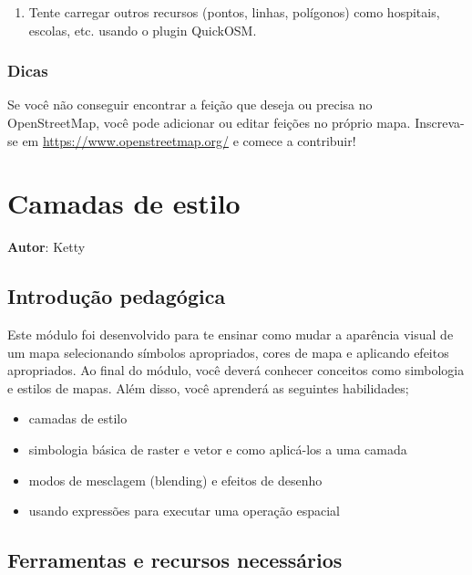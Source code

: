 \documentclass[
]{book}
\providecommand{\tightlist}{%
  \setlength{\itemsep}{0pt}\setlength{\parskip}{0pt}}
\begin{document}
\begin{enumerate}
\def\labelenumi{\arabic{enumi}.}
\tightlist
\item
  Tente carregar outros recursos (pontos, linhas, polígonos) como hospitais, escolas, etc. usando o plugin QuickOSM.
\end{enumerate}

\hypertarget{dicas-3}{%
\subsection{Dicas}\label{dicas-3}}

Se você não conseguir encontrar a feição que deseja ou precisa no OpenStreetMap, você pode adicionar ou editar feições no próprio mapa. Inscreva-se em \url{https://www.openstreetmap.org/} e comece a contribuir!

\hypertarget{camadas-de-estilo}{%
\chapter{Camadas de estilo}\label{camadas-de-estilo}}

\textbf{Autor}: Ketty

\hypertarget{introduuxe7uxe3o-pedaguxf3gica-4}{%
\section{Introdução pedagógica}\label{introduuxe7uxe3o-pedaguxf3gica-4}}

Este módulo foi desenvolvido para te ensinar como mudar a aparência visual de um mapa selecionando símbolos apropriados, cores de mapa e aplicando efeitos apropriados. Ao final do módulo, você deverá conhecer conceitos como simbologia e estilos de mapas. Além disso, você aprenderá as seguintes habilidades;

\begin{itemize}
\tightlist
\item
  camadas de estilo
\item
  simbologia básica de raster e vetor e como aplicá-los a uma camada
\item
  modos de mesclagem (blending) e efeitos de desenho
\item
  usando expressões para executar uma operação espacial
\end{itemize}

\hypertarget{ferramentas-e-recursos-necessuxe1rios-4}{%
\section{Ferramentas e recursos necessários}\label{ferramentas-e-recursos-necessuxe1rios-4}}
\end{document}
